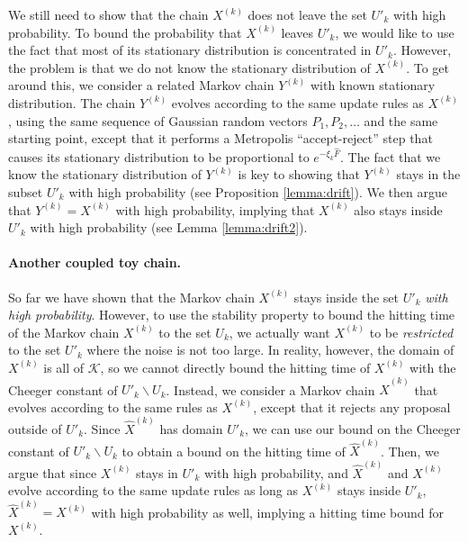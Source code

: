 \documentclass[final,12pt]{colt2018} %
\begin{document}
{We still need to show that the chain $X^{(k)}$ does not leave the set $U'_k$ with high probability. 
%
To bound the probability that  $X^{(k)}$ leaves $U'_k$, we would like to use the fact that most of its stationary distribution is concentrated in $U'_k$. 
%
However, the problem is that we do not know the stationary distribution of $X^{(k)}$.
%
To get around this, we consider a related Markov chain $Y^{(k)}$ with known stationary distribution. 
%
The chain $Y^{(k)}$ evolves according to the same update rules as $X^{(k)}$, using the same sequence of Gaussian random vectors $P_1,P_2,\ldots$ and the same starting point, except that it performs a Metropolis ``accept-reject'' step that causes its stationary distribution to be proportional to $e^{-\xi_k \hat{F}}$. 
%
The fact that we know the stationary distribution of $Y^{(k)}$ is key to showing that $Y^{(k)}$ stays in the subset $U'_k$ with high probability (see Proposition \ref{lemma:drift}).  
%
We then argue that $Y^{(k)} = X^{(k)}$ with high probability, implying that $X^{(k)}$ also stays inside  $U'_k$  with high probability (see Lemma \ref{lemma:drift2}).

\paragraph{Another coupled toy chain.}
So far we have shown that the Markov chain $X^{(k)}$ stays inside the set $U'_k$ \emph{with high probability}.  
%
However, to use the stability property to bound the hitting time of the Markov chain $X^{(k)}$ to the set $U_k$, we actually want  $X^{(k)}$ to be \emph{restricted} to the set $U'_k$ where the noise is not too large.  
%
In reality, however, the domain of $X^{(k)}$ is all of $\mathcal{K}$, so we cannot directly bound the hitting time of $X^{(k)}$ with the Cheeger constant of $U'_k\backslash U_k$.
%
 Instead, we consider a Markov chain $\hat{X}^{(k)}$ that evolves according to the same rules as $X^{(k)}$, except that it rejects any proposal outside of $U'_k$.  Since  $\hat{X}^{(k)}$ has domain $U'_k$, we can use our bound on the Cheeger constant of $U'_k\backslash U_k$ to obtain a bound on the hitting time of $\hat{X}^{(k)}$.  
 Then, we argue that since $X^{(k)}$ stays in $U'_k$ with high probability, and $\hat{X}^{(k)}$ and $X^{(k)}$ evolve according to the same update rules as long as $X^{(k)}$ stays inside $U'_k$, $\hat{X}^{(k)} = X^{(k)}$ with high probability as well, implying a hitting time bound for $X^{(k)}$.

}
\end{document}
